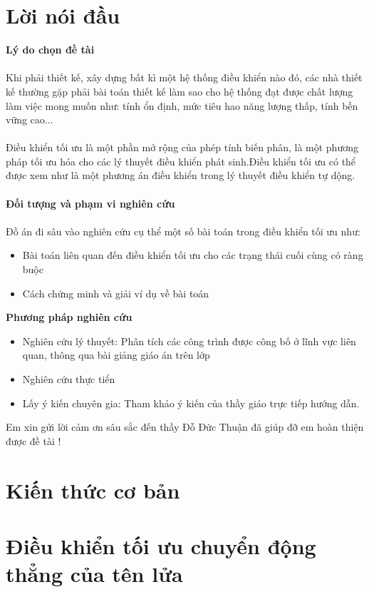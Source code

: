 \documentclass[12pt,a4paper]{report}
\begin{document}
	\chapter*{Lời nói đầu}
	\setcounter{page}{1}
	\textbf{Lý do chọn đề tài}\\\\
	Khi phải thiết kế, xây dựng bất kì một hệ thống điều khiển nào đó, các nhà thiết kế thường gặp phải bài toán thiết kế làm sao cho hệ thống đạt được chất lượng làm việc mong muốn như: tính ổn định, mức tiêu hao năng lượng thấp, tính bền vững cao...\\\\ Điều khiển tối ưu là một phần mở rộng của phép tính biến phân, là một phương pháp tối ưu hóa cho các lý thuyết điều khiển phát sinh.Điều khiển tối ưu có thể được xem như là một phương án điều khiển trong lý thuyết điều khiển tự dộng.\\\\
	\textbf{Đối tượng và phạm vi nghiên cứu} \\\\
	Đồ án đi sâu vào nghiên cứu cụ thể một số bài toán trong điều khiển tối ưu như:
	\begin{itemize}
		\item Bài toán liên quan đến điều khiển tối ưu cho các trạng thái cuối cùng có ràng buộc
		\item Cách chứng minh và giải ví dụ về bài toán
	\end{itemize}
	\textbf{Phương pháp nghiên cứu}
	\begin{itemize}
		\item Nghiên cứu lý thuyết: Phân tích các công trình được công bố ở lĩnh vực liên quan, thông qua bài giảng giáo án trên lớp
		\item Nghiên cứu thực tiển
		\item Lấy ý kiến chuyên gia: Tham khảo ý kiến của thầy giáo trực tiếp hướng dẫn.
	\end{itemize}
	Em xin gửi lời cảm ơn sâu sắc đến thầy Đỗ Đức Thuận đã giúp đỡ em hoàn thiện được đề tài !
	
	\chapter{Kiến thức cơ bản}
	
	\chapter{Điều khiển tối ưu chuyển động thẳng của tên lửa}
	
\end{document}
